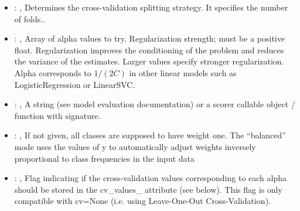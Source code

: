 \begin{itemize}
    \item {}: ,
      Determines the cross-validation splitting strategy.
      It specifies the number of folds..

    \item {}: ,
      Array of alpha values to try. Regularization strength; must be a positive float.
      Regularization                                                  improves the conditioning of
      the problem and reduces the variance of the estimates.
      Larger values specify stronger regularization. Alpha corresponds to $1 / (2C)$ in other
      linear models such as LogisticRegression or LinearSVC.

    \item {}: ,
      A string (see model evaluation documentation) or a scorer
      callable object / function with signature.

    \item {}: \xmlDesc{[balanced]},
      If not given, all classes are supposed to have weight one.
      The “balanced” mode uses the values of y to automatically adjust weights
      inversely proportional to class frequencies in the input data

    \item {}: ,
      Flag indicating if the cross-validation values corresponding
      to each alpha should be stored in the cv\_values\_ attribute (see below).
      This flag is only compatible with cv=None (i.e. using Leave-One-Out
      Cross-Validation).
  \end{itemize}


